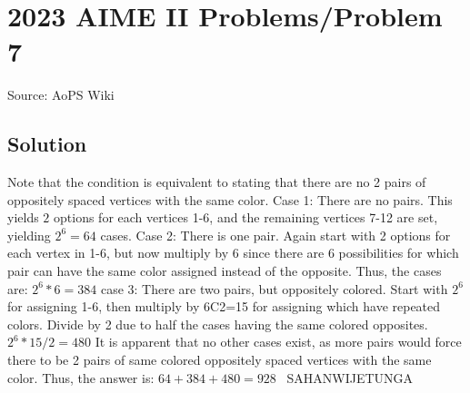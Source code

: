 \documentclass[12pt]{article}
\begin{document}
\section*{{2023 AIME II Problems/Problem 7}}
Source: AoPS Wiki

\subsection*{Solution}
Note that the condition is equivalent to stating that there are no 2 pairs of oppositely spaced vertices with the same color. Case 1: There are no pairs. This yields $2$ options for each vertices 1-6, and the remaining vertices 7-12 are set, yielding $2^6=64$ cases. Case 2: There is one pair. Again start with 2 options for each vertex in 1-6, but now multiply by 6 since there are 6 possibilities for which pair can have the same color assigned instead of the opposite. Thus, the cases are: $2^6*6=384$ case 3: There are two pairs, but oppositely colored. Start with $2^6$ for assigning 1-6, then multiply by 6C2=15 for assigning which have repeated colors. Divide by 2 due to half the cases having the same colored opposites. $2^6*15/2=480$ It is apparent that no other cases exist, as more pairs would force there to be 2 pairs of same colored oppositely spaced vertices with the same color. Thus, the answer is: $64+384+480=\boxed{928}$ ~SAHANWIJETUNGA
\end{document}
